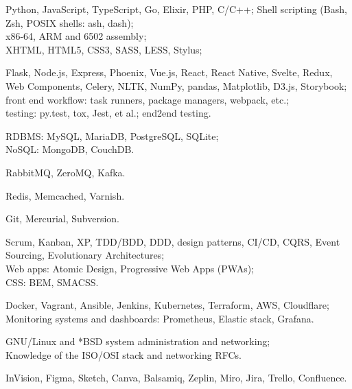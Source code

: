 \documentclass{resume}
\begin{document}
\begin{skillssection}
        {Python, JavaScript, TypeScript, Go, Elixir, PHP, C/C++; Shell
            scripting (Bash, Zsh, POSIX shells: ash, dash);\\%
            x86-64, ARM and 6502 assembly;\\%
            XHTML, HTML5, CSS3, SASS, LESS, Stylus;}

        {Flask, Node.js, Express, Phoenix, Vue.js, React, React Native, Svelte,
            Redux, Web Components, Celery, NLTK, NumPy, pandas, Matplotlib,
            D3.js, Storybook;\\%
            front end workflow: task runners, package managers, webpack,
            etc.;\\%
            testing: py.test, tox, Jest, et al.; end2end testing.}

        {RDBMS: MySQL, MariaDB, PostgreSQL, SQLite;\\%
            NoSQL: MongoDB, CouchDB.}

        {RabbitMQ, ZeroMQ, Kafka.}

        {Redis, Memcached, Varnish.}

        {Git, Mercurial, Subversion.}

        {Scrum, Kanban, XP, TDD/BDD, DDD, design patterns, CI/CD, CQRS, Event
            Sourcing, Evolutionary Architectures;\\%
            Web apps: Atomic Design, Progressive Web Apps (PWAs);\\%
            CSS: BEM, SMACSS.}

        {Docker, Vagrant, Ansible, Jenkins, Kubernetes, Terraform, AWS,
            Cloudflare;\\%
            Monitoring systems and dashboards: Prometheus, Elastic stack,
            Grafana.}

        {GNU/Linux and *BSD system administration and networking;\\%
            Knowledge of the ISO/OSI stack and networking RFCs.}

        {InVision, Figma, Sketch, Canva, Balsamiq, Zeplin, Miro, Jira, Trello,
            Confluence.}
\end{skillssection}
\end{document}
